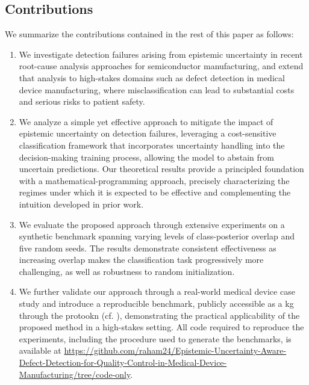 \subsection{Contributions}
\label{subsec:contributions}
We summarize the contributions contained in the rest of this paper as follows:
\begin{enumerate}
    \item
          We investigate detection failures arising from epistemic uncertainty in recent root-cause analysis approaches for semiconductor manufacturing, and extend that analysis to high-stakes domains such as defect detection in medical device manufacturing, where misclassification can lead to substantial costs and serious risks to patient safety.
    \item We analyze a simple yet effective approach to mitigate the impact of epistemic uncertainty on detection failures, leveraging a cost-sensitive classification framework that incorporates uncertainty handling into the decision-making training process, allowing the model to abstain from uncertain predictions. Our theoretical results provide a principled foundation with a mathematical-programming approach, precisely characterizing the regimes under which it is expected to be effective and complementing the intuition developed in prior work.
    \item We evaluate the proposed approach through extensive experiments on a synthetic benchmark spanning varying levels of class-posterior overlap and five random seeds. The results demonstrate consistent effectiveness as increasing overlap makes the classification task progressively more challenging, as well as robustness to random initialization.
    \item We further validate our approach through a real-world medical device case study and introduce a reproducible benchmark, publicly accessible as a \gls*{kg} through the \gls*{protookn} (cf. \cite{protookn,oknregistry}), demonstrating the practical applicability of the proposed method in a high-stakes setting. All code required to reproduce the experiments, including the procedure used to generate the benchmarks, is available at \url{https://github.com/raham24/Epistemic-Uncertainty-Aware-Defect-Detection-for-Quality-Control-in-Medical-Device-Manufacturing/tree/code-only}.
\end{enumerate}
